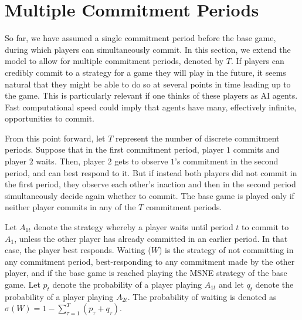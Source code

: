 \documentclass[../paper.tex]{subfiles}
\begin{document}
\section{Multiple Commitment Periods}\label{sec:convergence}
So far, we have assumed a single commitment period before the base game, during which players can simultaneously commit. In this section, we extend the model to allow for multiple commitment periods, denoted by $T$. If players can credibly commit to a strategy for a game they will play in the future, it seems natural that they might be able to do so at several points in time leading up to the game. This is particularly relevant if one thinks of these players as AI agents. Fast computational speed could imply that agents have many, effectively infinite, opportunities to commit.
 
From this point forward, let $T$ represent the number of discrete commitment periods. 
Suppose that in the first commitment period, player $1$ commits and player $2$ waits. Then, player $2$ gets to observe $1$'s commitment in the second period, and can best respond to it. 
But if instead both players did not commit in the first period, they observe each other’s inaction and then in the second period simultaneously decide again whether to commit. The base game is played only if neither player commits in any of the $T$ commitment periods. 

Let $A_{1t}$ denote the strategy whereby a player waits until period $t$ to commit to $A_1$, unless the other player has already committed in an earlier period. In that case, the player best responds. Waiting ($W$) is the strategy of not committing in any commitment period, best-responding to any commitment made by the other player, and if the base game is reached playing the MSNE strategy of the base game. 
Let $p_{t}$ denote the probability of a player playing $A_{1t}$ and let $q_t$ denote the probability of a player playing $A_{2t}$. The probability of waiting is denoted as $\sigma(W)=1-\sum_{\tau=1}^{T}(p_\tau+q_\tau)$.  
 
\end{document}
